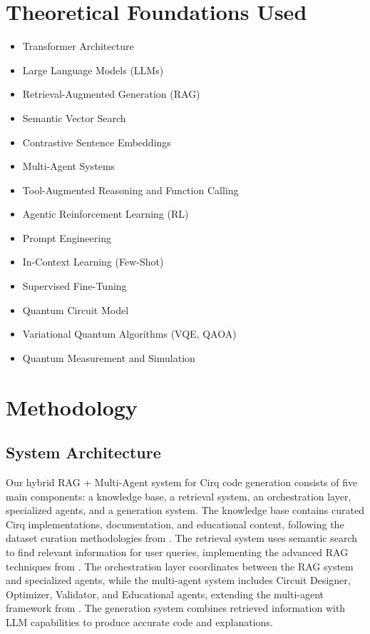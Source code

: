 \documentclass[runningheads]{llncs}
\begin{document}
\section{Theoretical Foundations Used}

\begin{itemize}
\item Transformer Architecture
\item Large Language Models (LLMs)
\item Retrieval-Augmented Generation (RAG)
\item Semantic Vector Search
\item Contrastive Sentence Embeddings
\item Multi-Agent Systems
\item Tool-Augmented Reasoning and Function Calling
\item Agentic Reinforcement Learning (RL)
\item Prompt Engineering
\item In-Context Learning (Few-Shot)
\item Supervised Fine-Tuning
\item Quantum Circuit Model
\item Variational Quantum Algorithms (VQE, QAOA)
\item Quantum Measurement and Simulation
\end{itemize}

\section{Methodology}

\subsection{System Architecture}
Our hybrid RAG + Multi-Agent system for Cirq code generation consists of five main components: a knowledge base, a retrieval system, an orchestration layer, specialized agents, and a generation system. The knowledge base contains curated Cirq implementations, documentation, and educational content, following the dataset curation methodologies from \cite{basit2025pennylangpioneeringllmbasedquantum}. The retrieval system uses semantic search to find relevant information for user queries, implementing the advanced RAG techniques from \cite{siavash2025modeldrivenquantumcodegeneration}. The orchestration layer coordinates between the RAG system and specialized agents, while the multi-agent system includes Circuit Designer, Optimizer, Validator, and Educational agents, extending the multi-agent framework from \cite{campbell2025enhancingllmbasedquantumcode}. The generation system combines retrieved information with LLM capabilities to produce accurate code and explanations.
\end{document}
